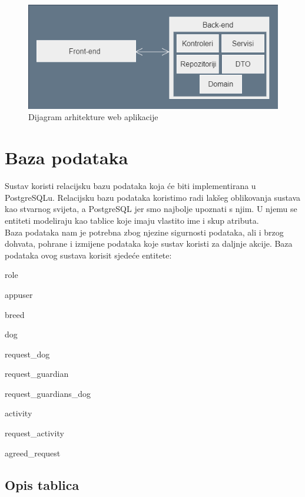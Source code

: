 		\begin{figure}[htb]
			\centering
			\includegraphics[width=14cm]{slike/arhitekturaaa}
			\caption{Dijagram arhitekture web aplikacije} 
			\label{fig:arhitektura-dijagram}
		\end{figure}
		
		\eject
				
		\section{Baza podataka}
			
			Sustav koristi relacijsku bazu podataka koja će biti implementirana u PostgreSQLu. Relacijsku bazu podataka koristimo radi lakšeg oblikovanja sustava kao stvarnog svijeta, a PostgreSQL jer smo najbolje upoznati s njim. U njemu se entiteti modeliraju kao tablice koje imaju vlastito ime i skup atributa.\\
			Baza podataka nam je potrebna zbog njezine sigurnosti podataka, ali i brzog dohvata, pohrane i izmijene podataka koje sustav koristi za daljnje akcije.
			Baza podataka ovog sustava korisit sjedeće entitete:
			\begin{packed_item}
				\item role
				\item appuser
				\item breed
				\item dog
				\item request\_dog
				\item request\_guardian
				\item request\_guardians\_dog
				\item activity
				\item request\_activity
				\item agreed\_request
				
			\end{packed_item}
			
		
			\subsection{Opis tablica}
			
